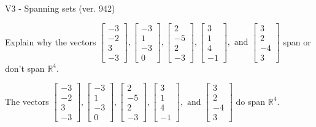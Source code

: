 \begin{exercise}
  \begin{exerciseTitle}V3 - Spanning sets (ver. 942)\end{exerciseTitle}
  \begin{exerciseStatement}
    Explain why the vectors \(\left[\begin{array}{r}
-3 \\
-2 \\
3 \\
-3
\end{array}\right] , \left[\begin{array}{r}
-3 \\
1 \\
-3 \\
0
\end{array}\right] , \left[\begin{array}{r}
2 \\
-5 \\
2 \\
-3
\end{array}\right] , \left[\begin{array}{r}
3 \\
1 \\
4 \\
-1
\end{array}\right] , \text{ and } \left[\begin{array}{r}
3 \\
2 \\
-4 \\
3
\end{array}\right]\) span or don't span \(\mathbb{R}^4\). 
	


  \end{exerciseStatement}
  \begin{exerciseAnswer}
   The vectors \(\left[\begin{array}{r}
-3 \\
-2 \\
3 \\
-3
\end{array}\right] , \left[\begin{array}{r}
-3 \\
1 \\
-3 \\
0
\end{array}\right] , \left[\begin{array}{r}
2 \\
-5 \\
2 \\
-3
\end{array}\right] , \left[\begin{array}{r}
3 \\
1 \\
4 \\
-1
\end{array}\right] , \text{ and } \left[\begin{array}{r}
3 \\
2 \\
-4 \\
3
\end{array}\right]\) 
  	 do  
	span \(\mathbb{R}^4\).
  



\end{exerciseAnswer}
\end{exercise}
